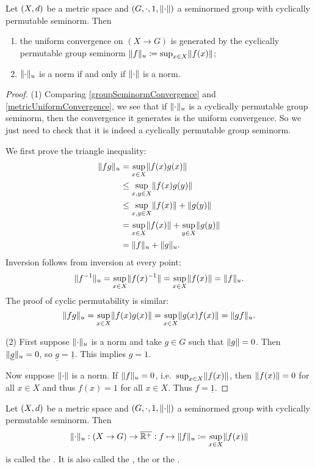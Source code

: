 \begin{lemma} \label{groupUniformNorm}
Let $\sSet{X,d}$ be a metric space and $\sSet{G,\cdot, 1,\norm{\cdot}}$ a seminormed group with cyclically permutable seminorm. Then
\begin{enumerate}
\item the uniform convergence on $(X\to G)$ is generated by the cyclically permutable group seminorm $\lVert f\rVert_{u} \coloneqq \sup_{x\in X}\lVert f(x)\rVert$;
\item $\lVert\cdot\rVert_u$ is a norm \textup{if and only if} $\lVert\cdot\rVert$ is a norm.
\end{enumerate}
\end{lemma}
\begin{proof}
(1) Comparing \ref{groupSeminormConvergence} and \ref{metricUniformConvergence}, we see that if $\lVert\cdot\rVert_u$ is a cyclically permutable group seminorm, then the convergence it generates is the uniform convergence. So we just need to check that it is indeed a cyclically permutable group seminorm.

We first prove the triangle inequality:
\begin{align*}
\lVert fg\rVert_u &= \sup_{x\in X}\lVert f(x)g(x)\rVert \\
&\leq \sup_{x,y\in X}\lVert f(x)g(y)\rVert \\
&\leq \sup_{x,y\in X}\lVert f(x)\rVert + \lVert g(y)\rVert \\
&= \sup_{x\in X}\lVert f(x)\rVert + \sup_{y\in X}\lVert g(y)\rVert \\
&= \lVert f\rVert_u + \lVert g\rVert_u.
\end{align*}
Inversion follows from inversion at every point:
\[ \lVert f^{-1}\rVert_u = \sup_{x\in X}\lVert f(x)^{-1}\rVert = \sup_{x\in X}\lVert f(x)\rVert = \lVert f\rVert_u. \]
The proof of cyclic permutability is similar:
\[ \lVert fg\rVert_u = \sup_{x\in X}\lVert f(x)g(x)\rVert = \sup_{x\in X}\lVert g(x)f(x)\rVert = \lVert gf\rVert_u. \]

(2) First suppose $\lVert\cdot\rVert_u$ is a norm and take $g\in G$ such that $\lVert g\rVert= 0$. Then $\lVert\underline{g}\rVert_u = 0$, so $\underline{g} = \underline{1}$. This implies $g = 1$.

Now suppose $\lVert\cdot\rVert$ is a norm. If $\lVert f\rVert_u = 0$, i.e.\ $\sup_{x\in X}\lVert f(x)\rVert$, then $\lVert f(x)\rVert = 0$ for all $x\in X$ and thus $f(x) = 1$ for all $x\in X$. Thus $f = \underline{1}$.
\end{proof}

\begin{definition}
Let $\sSet{X,d}$ be a metric space and $\sSet{G,\cdot, 1,\norm{\cdot}}$ a seminormed group with cyclically permutable seminorm. Then
\[ \lVert\cdot\rVert_u: (X\to G) \to \overline{\mathbb{R}^+}: f\mapsto \lVert f\rVert_u \coloneqq \sup_{x\in X}\lVert f(x)\rVert \]
is called the . It is also called the , the  or the .
\end{definition}

